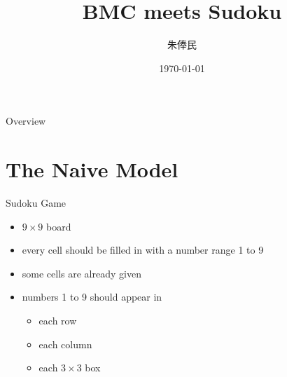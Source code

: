 \documentclass[11pt]{beamer}
\theoremstyle{definition}
\begin{document}
\title{BMC meets Sudoku}
\author[朱俸民]{朱俸民}
\date{\today}


\begin{frame}
    \titlepage
\end{frame}

\begin{frame}{Overview}
    \tableofcontents
\end{frame}

\section{The Naive Model}

\begin{frame}{Sudoku Game}
    \begin{itemize}
        \item $9 \times 9$ board
        \item every cell should be filled in with a number range 1 to 9
        \item some cells are already given
        \item numbers 1 to 9 should appear in
        \begin{itemize}
            \item each row
            \item each column
            \item each $3 \times 3$ box
        \end{itemize}
    \end{itemize}
\end{frame}
\end{document}

